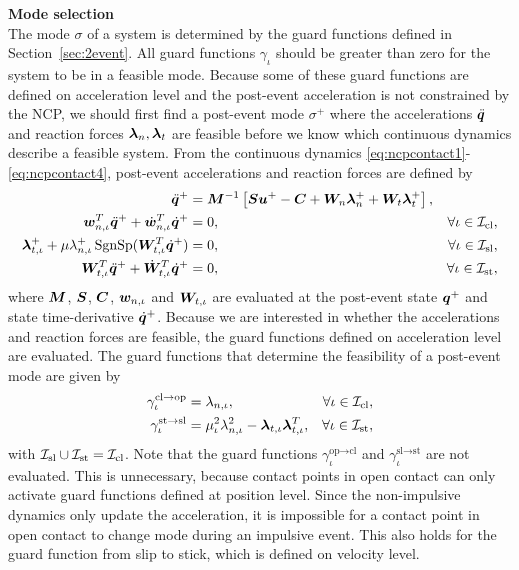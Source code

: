 \documentclass[../DC2017114Bouma.tex]{subfiles}
\begin{document}
\textbf{Mode selection}\\
The mode $\sigma$ of a system is determined by the guard functions defined in Section~\ref{sec:2event}. All guard functions $\gamma_\iota$ should be greater than zero for the system to be in a feasible mode. Because some of these guard functions are defined on acceleration level and the post-event acceleration is not constrained by the NCP, we should first find a post-event mode $\sigma^+$ where the accelerations $\ddot{{\boldsymbol{q}}}$ and reaction forces $\boldsymbol{\lambda}_{n},\boldsymbol{\lambda}_{t}$ are feasible before we know which continuous dynamics describe a feasible system. From the continuous dynamics \eqref{eq:ncpcontact1}-\eqref{eq:ncpcontact4}, post-event accelerations and reaction forces are defined by
\begin{align}
\ddot{{\boldsymbol{q}}}^+ &= {\boldsymbol{M}}^{-1}\left[{\boldsymbol{S}}{\boldsymbol{u}}^+ - {\boldsymbol{C}} + {\boldsymbol{W}}_{n}\boldsymbol{\lambda}^+_{n} + {\boldsymbol{W}}_{t}\boldsymbol{\lambda}^+_{t}\right], &  \label{eq:2nonimp1}\\
{\boldsymbol{w}}^T_{n,\iota}\ddot{{\boldsymbol{q}}}^+ + \dot{{\boldsymbol{w}}}^T_{n,\iota}\dot{{\boldsymbol{q}}}^+ &= 0, & \forall \iota\in\mathcal{I}_{\text{cl}},\label{eq:2nonimp2}\\
\boldsymbol{\lambda}^+_{t,\iota} + \mu\lambda^+_{n,\iota}\operatorname{\text{SgnSp}}({\boldsymbol{W}}_{t,\iota}^T\dot{{\boldsymbol{q}}}^+) &= 0, & \forall \iota\in\mathcal{I}_{\text{sl}},\label{eq:2nonimp3}\\
{\boldsymbol{W}}^T_{t,\iota}\ddot{{\boldsymbol{q}}}^+ + \dot{{\boldsymbol{W}}}^T_{t,\iota}\dot{{\boldsymbol{q}}}^+ &= 0, & \forall \iota\in\mathcal{I}_{\text{st}},\label{eq:2nonimp4}
\end{align}
where ${\boldsymbol{M}}$, ${\boldsymbol{S}}$, ${\boldsymbol{C}}$, ${\boldsymbol{w}}_{n,\iota}$ and ${\boldsymbol{W}}_{t,\iota}$ are evaluated at the post-event state ${\boldsymbol{q}}^+$ and state time-derivative $\dot{{\boldsymbol{q}}}^+$. Because we are interested in whether the accelerations and reaction forces are feasible, the guard functions defined on acceleration level are evaluated. The guard functions that determine the feasibility of a post-event mode are given by
\begin{align}
\gamma^{\text{cl}\rightarrow\text{op}}_{\iota} &= \lambda_{n,\iota}, & \forall \iota\in\mathcal{I}_{\text{cl}},\\
\gamma^{\text{st}\rightarrow\text{sl}}_{\iota} &= \mu_{\iota}^2\lambda_{n,\iota}^2 - \boldsymbol{\lambda}_{t,\iota}\boldsymbol{\lambda}_{t,\iota}^T, & \forall \iota\in\mathcal{I}_{\text{st}},
\end{align}
with $\mathcal{I}_{\text{sl}}\cup\mathcal{I}_{\text{st}}=\mathcal{I}_{\text{cl}}$. Note that the guard functions $\gamma_{\iota}^{\text{op}\rightarrow\text{cl}}$ and $\gamma_{\iota}^{\text{sl}\rightarrow\text{st}}$ are not evaluated. This is unnecessary, because contact points in open contact can only activate guard functions defined at position level. Since the non-impulsive dynamics only update the acceleration, it is impossible for a contact point in open contact to change mode during an impulsive event. This also holds for the guard function from slip to stick, which is defined on velocity level.
\end{document}
